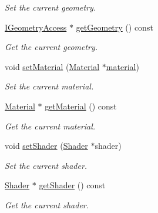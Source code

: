 \begin{DoxyCompactItemize}
\begin{DoxyCompactList}\small\item\em Set the current geometry. \end{DoxyCompactList}\item 
\mbox{\hyperlink{classec_1_1_i_geometry_access}{I\+Geometry\+Access}} $\ast$ \mbox{\hyperlink{classec_1_1_drawable_a49a90aac40736ff3c182196c2b86c2f3}{get\+Geometry}} () const
\begin{DoxyCompactList}\small\item\em Get the current geometry. \end{DoxyCompactList}\item 
void \mbox{\hyperlink{classec_1_1_drawable_a0fc7868639a83830d4b60dfad85a0826}{set\+Material}} (\mbox{\hyperlink{classec_1_1_material}{Material}} $\ast$\mbox{\hyperlink{_resource_type_8h_a16f6cac2c88eef38bdba4f004e042542}{material}})
\begin{DoxyCompactList}\small\item\em Set the current material. \end{DoxyCompactList}\item 
\mbox{\hyperlink{classec_1_1_material}{Material}} $\ast$ \mbox{\hyperlink{classec_1_1_drawable_ac74210aca5428bedbf8af7abe9adbcc1}{get\+Material}} () const
\begin{DoxyCompactList}\small\item\em Get the current material. \end{DoxyCompactList}\item 
void \mbox{\hyperlink{classec_1_1_drawable_a413f373bb2cba109497377e18b084048}{set\+Shader}} (\mbox{\hyperlink{classec_1_1_shader}{Shader}} $\ast$shader)
\begin{DoxyCompactList}\small\item\em Set the current shader. \end{DoxyCompactList}\item 
\mbox{\hyperlink{classec_1_1_shader}{Shader}} $\ast$ \mbox{\hyperlink{classec_1_1_drawable_a7de4c8aa937bda1009c6428ceeb541c1}{get\+Shader}} () const
\begin{DoxyCompactList}\small\item\em Get the current shader. \end{DoxyCompactList}\end{DoxyCompactItemize}
